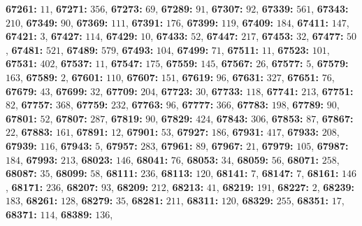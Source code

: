 \textsf{\bfseries 67261:} $11$, \textsf{\bfseries 67271:} $356$, \textsf{\bfseries 67273:} $69$, \textsf{\bfseries 67289:} $91$, \textsf{\bfseries 67307:} $92$, \textsf{\bfseries 67339:} $561$, \textsf{\bfseries 67343:} $210$, \textsf{\bfseries 67349:} $90$, \textsf{\bfseries 67369:} $111$, \textsf{\bfseries 67391:} $176$, \textsf{\bfseries 67399:} $119$, \textsf{\bfseries 67409:} $184$, \textsf{\bfseries 67411:} $147$, \textsf{\bfseries 67421:} $3$, \textsf{\bfseries 67427:} $114$, \textsf{\bfseries 67429:} $10$, \textsf{\bfseries 67433:} $52$, \textsf{\bfseries 67447:} $217$, \textsf{\bfseries 67453:} $32$, \textsf{\bfseries 67477:} $50$, \textsf{\bfseries 67481:} $521$, \textsf{\bfseries 67489:} $579$, \textsf{\bfseries 67493:} $104$, \textsf{\bfseries 67499:} $71$, \textsf{\bfseries 67511:} $11$, \textsf{\bfseries 67523:} $101$, \textsf{\bfseries 67531:} $402$, \textsf{\bfseries 67537:} $11$, \textsf{\bfseries 67547:} $175$, \textsf{\bfseries 67559:} $145$, \textsf{\bfseries 67567:} $26$, \textsf{\bfseries 67577:} $5$, \textsf{\bfseries 67579:} $163$, \textsf{\bfseries 67589:} $2$, \textsf{\bfseries 67601:} $110$, \textsf{\bfseries 67607:} $151$, \textsf{\bfseries 67619:} $96$, \textsf{\bfseries 67631:} $327$, \textsf{\bfseries 67651:} $76$, \textsf{\bfseries 67679:} $43$, \textsf{\bfseries 67699:} $32$, \textsf{\bfseries 67709:} $204$, \textsf{\bfseries 67723:} $30$, \textsf{\bfseries 67733:} $118$, \textsf{\bfseries 67741:} $213$, \textsf{\bfseries 67751:} $82$, \textsf{\bfseries 67757:} $368$, \textsf{\bfseries 67759:} $232$, \textsf{\bfseries 67763:} $96$, \textsf{\bfseries 67777:} $366$, \textsf{\bfseries 67783:} $198$, \textsf{\bfseries 67789:} $90$, \textsf{\bfseries 67801:} $52$, \textsf{\bfseries 67807:} $287$, \textsf{\bfseries 67819:} $90$, \textsf{\bfseries 67829:} $424$, \textsf{\bfseries 67843:} $306$, \textsf{\bfseries 67853:} $87$, \textsf{\bfseries 67867:} $22$, \textsf{\bfseries 67883:} $161$, \textsf{\bfseries 67891:} $12$, \textsf{\bfseries 67901:} $53$, \textsf{\bfseries 67927:} $186$, \textsf{\bfseries 67931:} $417$, \textsf{\bfseries 67933:} $208$, \textsf{\bfseries 67939:} $116$, \textsf{\bfseries 67943:} $5$, \textsf{\bfseries 67957:} $283$, \textsf{\bfseries 67961:} $89$, \textsf{\bfseries 67967:} $21$, \textsf{\bfseries 67979:} $105$, \textsf{\bfseries 67987:} $184$, \textsf{\bfseries 67993:} $213$, \textsf{\bfseries 68023:} $146$, \textsf{\bfseries 68041:} $76$, \textsf{\bfseries 68053:} $34$, \textsf{\bfseries 68059:} $56$, \textsf{\bfseries 68071:} $258$, \textsf{\bfseries 68087:} $35$, \textsf{\bfseries 68099:} $58$, \textsf{\bfseries 68111:} $236$, \textsf{\bfseries 68113:} $120$, \textsf{\bfseries 68141:} $7$, \textsf{\bfseries 68147:} $7$, \textsf{\bfseries 68161:} $146$, \textsf{\bfseries 68171:} $236$, \textsf{\bfseries 68207:} $93$, \textsf{\bfseries 68209:} $212$, \textsf{\bfseries 68213:} $41$, \textsf{\bfseries 68219:} $191$, \textsf{\bfseries 68227:} $2$, \textsf{\bfseries 68239:} $183$, \textsf{\bfseries 68261:} $128$, \textsf{\bfseries 68279:} $35$, \textsf{\bfseries 68281:} $211$, \textsf{\bfseries 68311:} $120$, \textsf{\bfseries 68329:} $255$, \textsf{\bfseries 68351:} $17$, \textsf{\bfseries 68371:} $114$, \textsf{\bfseries 68389:} $136$, 
